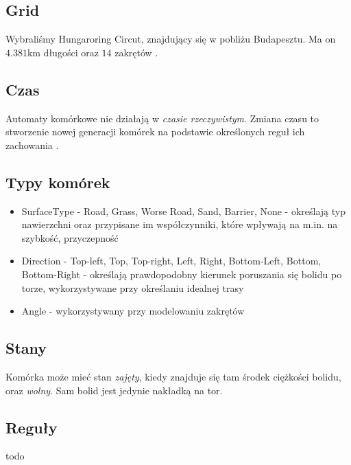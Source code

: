 \documentclass{article}
\begin{document}
\subsection{Grid} 

Wybraliśmy Hungaroring Circut, znajdujący się w pobliżu Budapesztu. Ma on $4.381$km długości oraz $14$ zakrętów \cite{track}. 

\subsection{Czas}

Automaty komórkowe nie działają w \textit{czasie rzeczywistym}. Zmiana czasu to stworzenie nowej generacji komórek na podstawie określonych reguł ich zachowania \cite{nature}. 

\subsection{Typy komórek}
\begin{itemize}
\item SurfaceType - Road, Grass, Worse Road, Sand, Barrier, None - określają typ nawierzchni oraz przypisane im współczynniki, które wpływają na m.in. na szybkość, przyczepność
\item Direction -  Top-left, Top, Top-right, Left, Right, Bottom-Left, Bottom, Bottom-Right - określają prawdopodobny kierunek poruszania się bolidu po torze, wykorzystywane przy określaniu idealnej trasy
\item Angle -  wykorzystywany przy modelowaniu zakrętów
\end{itemize}

\subsection{Stany}

Komórka może mieć stan \textit{zajęty}, kiedy znajduje się tam środek ciężkości bolidu, oraz \textit{wolny}. Sam bolid jest jedynie nakładką na tor.

\subsection{Reguły}
todo


\end{document}
